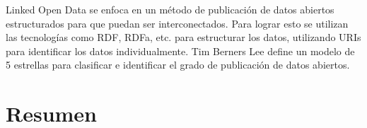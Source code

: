 Linked Open Data se enfoca en un método de publicación de datos abiertos estructurados para que puedan ser interconectados. Para lograr esto se utilizan las tecnologías como RDF, RDFa, etc. para estructurar los datos, utilizando URIs para identificar los datos individualmente. Tim Berners Lee define un modelo de 5 estrellas para clasificar e identificar el grado de publicación de datos abiertos.




\section{Resumen}

